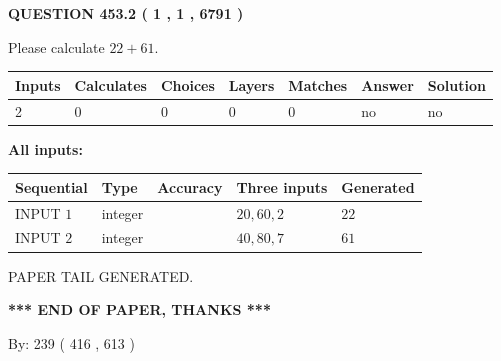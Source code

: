 \documentclass[12pt]{article}
\begin{document}
   
  
\vspace{0.2in}
  
{\textbf{\Large{QUESTION
453.2 
 ( 1 , 1 , 6791 )
}}}
  
  
 
Please calculate $ %
22 +  %
61 $.
 
 
   
   
   
   
\noindent\begin{tabular}{|l|l|l|l|l|l|l|}
 \hline
Inputs & Calculates & Choices & Layers & Matches & Answer & Solution \\ \hline
 2  & 
 0  & 
 0
  & 
 0  & 
 0  & 
  no & 
  no 
  \\ \hline
 \end{tabular}
   
   
   
   
\noindent{}
   
   
   
   
\noindent\vspace{0.1in}\hspace{-0.08in} {\textbf{\Large{All inputs: }}}
   
   
  
  
\noindent\begin{tabular}{|l|l|l|l|l|}
\hline
 Sequential & Type & Accuracy & Three inputs & Generated \\ 
\hline
 
 
  INPUT $  1 $ & integer &  & $
 20
 , 
 60
 , 
 2
 $ & $ 22 $ 
 \\  \hline  
 
 
  INPUT $  2 $ & integer &  & $
 40
 , 
 80
 , 
 7
 $ & $ 61 $ 
 \\  \hline  
 \end{tabular}
   
   
   
   
   
   
 \vspace{0.2in}
 
   
   
\vspace{2.0in} PAPER TAIL GENERATED.
   
   
   
   
\vspace{1.0in} 
{\textbf{\large{ *** END OF PAPER, THANKS *** }}} 
   
   
\hspace{1.0in} By: 
 239 ( 416 ,  613 )
   
\end{document}
